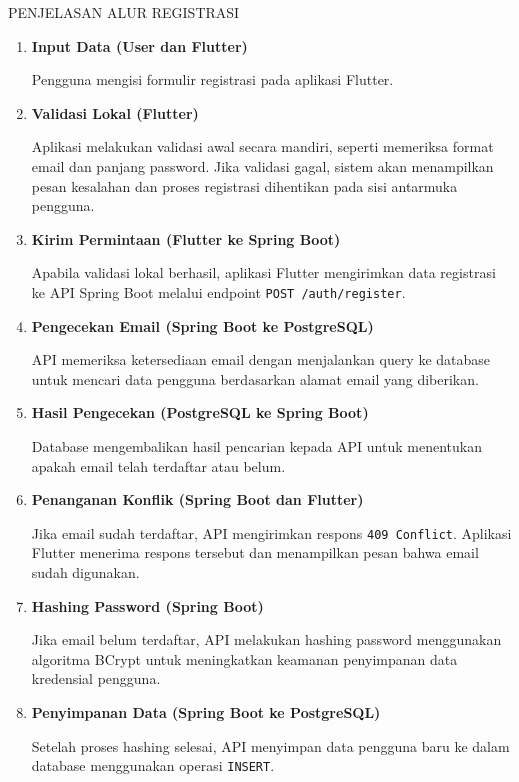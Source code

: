 \documentclass[11pt]{article}
\begin{document}
PENJELASAN ALUR REGISTRASI
\begin{enumerate}

\item \textbf{Input Data (User dan Flutter)}

Pengguna mengisi formulir registrasi pada aplikasi Flutter.

\item \textbf{Validasi Lokal (Flutter)}

Aplikasi melakukan validasi awal secara mandiri, seperti memeriksa format email dan panjang password. Jika validasi gagal, sistem akan menampilkan pesan kesalahan dan proses registrasi dihentikan pada sisi antarmuka pengguna.

\item \textbf{Kirim Permintaan (Flutter ke Spring Boot)}

Apabila validasi lokal berhasil, aplikasi Flutter mengirimkan data registrasi ke API Spring Boot melalui endpoint \texttt{POST /auth/register}.

\item \textbf{Pengecekan Email (Spring Boot ke PostgreSQL)}

API memeriksa ketersediaan email dengan menjalankan query ke database untuk mencari data pengguna berdasarkan alamat email yang diberikan.

\item \textbf{Hasil Pengecekan (PostgreSQL ke Spring Boot)}

Database mengembalikan hasil pencarian kepada API untuk menentukan apakah email telah terdaftar atau belum.

\item \textbf{Penanganan Konflik (Spring Boot dan Flutter)}

Jika email sudah terdaftar, API mengirimkan respons \texttt{409 Conflict}. Aplikasi Flutter menerima respons tersebut dan menampilkan pesan bahwa email sudah digunakan.

\item \textbf{Hashing Password (Spring Boot)}

Jika email belum terdaftar, API melakukan hashing password menggunakan algoritma BCrypt untuk meningkatkan keamanan penyimpanan data kredensial pengguna.

\item \textbf{Penyimpanan Data (Spring Boot ke PostgreSQL)}

Setelah proses hashing selesai, API menyimpan data pengguna baru ke dalam database menggunakan operasi \texttt{INSERT}.


\end{enumerate}
\end{document}
